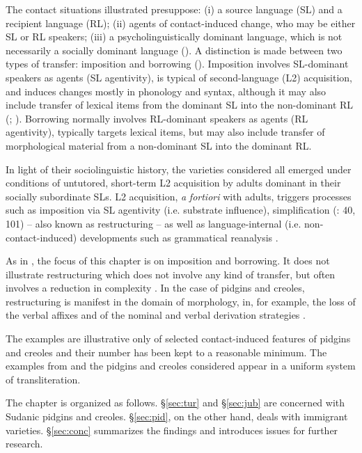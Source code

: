 \documentclass[output=paper]{langsci/langscibook}
\begin{document}
  The contact situations illustrated presuppose: (i) a {source language} ({SL}) and a {recipient language} ({RL}); (ii) agents of contact-induced change, who may be either {SL} or {RL} speakers; (iii) a psycholinguistically dominant language, which is not necessarily a socially dominant language (\citealt{VanCoetsem1988,VanCoetsem1995,VanCoetsem2000,VanCoetsem2003,Winford2005,Winford2008}). A distinction is made between two types of {transfer}: {imposition} and borrowing (\citealt{VanCoetsem1988,VanCoetsem2000,VanCoetsem2003}). Imposition involves SL-dominant speakers as agents ({SL} agentivity), is typical of second-language (L2) acquisition, and induces changes mostly in phonology and syntax, although it may also include {transfer} of lexical items from the dominant {SL} into the non-dominant {RL} (\citealt[18]{VanCoetsem1995}; \citealt[376]{Winford2005}). Borrowing normally involves RL-dominant speakers as agents ({RL} agentivity), typically targets lexical items, but may also include {transfer} of morphological material from a non-dominant {SL} into the dominant {RL}.

  In light of their sociolinguistic history, the varieties considered all emerged under conditions of untutored, short-term L2 acquisition by adults dominant in their socially subordinate SLs. L2 acquisition, \textit{a} \textit{fortiori} with adults, triggers processes such as {imposition} via {SL} agentivity (i.e. {substrate} influence), {simplification} (\citealt{Trudgill2011}: 40, 101) – also known as restructuring \citep[529]{Lucas2015} – as well as language-internal (i.e. non-contact-induced) developments such as grammatical reanalysis \citep[415]{Winford2005}.

  As in \citet{Manfredi2018}, the focus of this chapter is on {imposition} and borrowing. It does not illustrate restructuring which does not involve any kind of {transfer}, but often involves a reduction in complexity \citep[529]{Lucas2015}. In the case of  pidgins and creoles, restructuring is manifest in the domain of morphology, in, for example, the loss of the  verbal affixes and of the nominal and verbal {derivation} strategies \citep{Miller1993}.

  The examples are illustrative only of selected contact-induced features of  pidgins and creoles and their number has been kept to a reasonable minimum. The examples from  and the pidgins and creoles considered appear in a uniform system of transliteration.

  The chapter is organized as follows. §\ref{sec:tur} and §\ref{sec:jub} are concerned with {Sudanic} pidgins and creoles. §\ref{sec:pid}, on the other hand, deals with  immigrant varieties. §\ref{sec:conc} summarizes the findings and introduces issues for further research.
\end{document}
